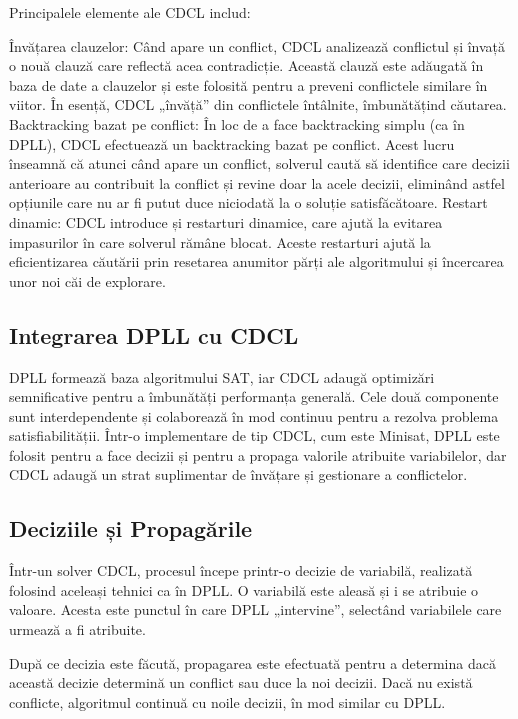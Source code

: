 \documentclass[runningheads]{llncs}
\begin{document}
Principalele elemente ale CDCL includ:

Învățarea clauzelor: Când apare un conflict, CDCL analizează conflictul și învață o nouă clauză care reflectă acea contradicție. Această clauză este adăugată în baza de date a clauzelor și este folosită pentru a preveni conflictele similare în viitor. În esență, CDCL „învăță” din conflictele întâlnite, îmbunătățind căutarea.
Backtracking bazat pe conflict: În loc de a face backtracking simplu (ca în DPLL), CDCL efectuează un backtracking bazat pe conflict. Acest lucru înseamnă că atunci când apare un conflict, solverul caută să identifice care decizii anterioare au contribuit la conflict și revine doar la acele decizii, eliminând astfel opțiunile care nu ar fi putut duce niciodată la o soluție satisfăcătoare.
Restart dinamic: CDCL introduce și restarturi dinamice, care ajută la evitarea impasurilor în care solverul rămâne blocat. Aceste restarturi ajută la eficientizarea căutării prin resetarea anumitor părți ale algoritmului și încercarea unor noi căi de explorare. \cite{audemardsimon2009glucose}
\subsection{Integrarea DPLL cu CDCL}

DPLL formează baza algoritmului SAT, iar CDCL adaugă optimizări semnificative pentru a îmbunătăți performanța generală. Cele două componente sunt interdependente și colaborează în mod continuu pentru a rezolva problema satisfiabilității. Într-o implementare de tip CDCL, cum este Minisat, DPLL este folosit pentru a face decizii și pentru a propaga valorile atribuite variabilelor, dar CDCL adaugă un strat suplimentar de învățare și gestionare a conflictelor.

\subsection{Deciziile și Propagările}
Într-un solver CDCL, procesul începe printr-o decizie de variabilă, realizată folosind aceleași tehnici ca în DPLL. O variabilă este aleasă și i se atribuie o valoare. Acesta este punctul în care DPLL „intervine”, selectând variabilele care urmează a fi atribuite.

După ce decizia este făcută, propagarea este efectuată pentru a determina dacă această decizie determină un conflict sau duce la noi decizii. Dacă nu există conflicte, algoritmul continuă cu noile decizii, în mod similar cu DPLL.
\end{document}
